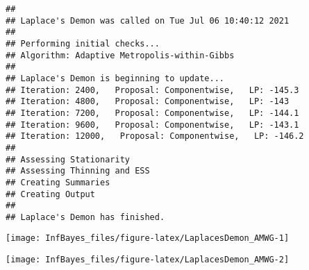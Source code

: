 \documentclass[
]{book}
\newenvironment{Shaded}{\begin{snugshade}}{\end{snugshade}}
\newcommand{\AttributeTok}[1]{\textcolor[rgb]{0.77,0.63,0.00}{#1}}
\newcommand{\CommentTok}[1]{\textcolor[rgb]{0.56,0.35,0.01}{\textit{#1}}}
\newcommand{\ConstantTok}[1]{\textcolor[rgb]{0.00,0.00,0.00}{#1}}
\newcommand{\DecValTok}[1]{\textcolor[rgb]{0.00,0.00,0.81}{#1}}
\newcommand{\FunctionTok}[1]{\textcolor[rgb]{0.00,0.00,0.00}{#1}}
\newcommand{\NormalTok}[1]{#1}
\newcommand{\OtherTok}[1]{\textcolor[rgb]{0.56,0.35,0.01}{#1}}
\newcommand{\SpecialCharTok}[1]{\textcolor[rgb]{0.00,0.00,0.00}{#1}}
\newcommand{\StringTok}[1]{\textcolor[rgb]{0.31,0.60,0.02}{#1}}
\begin{document}
\begin{verbatim}
## 
## Laplace's Demon was called on Tue Jul 06 10:40:12 2021
## 
## Performing initial checks...
## Algorithm: Adaptive Metropolis-within-Gibbs 
## 
## Laplace's Demon is beginning to update...
## Iteration: 2400,   Proposal: Componentwise,   LP: -145.3
## Iteration: 4800,   Proposal: Componentwise,   LP: -143
## Iteration: 7200,   Proposal: Componentwise,   LP: -144.1
## Iteration: 9600,   Proposal: Componentwise,   LP: -143.1
## Iteration: 12000,   Proposal: Componentwise,   LP: -146.2
## 
## Assessing Stationarity
## Assessing Thinning and ESS
## Creating Summaries
## Creating Output
## 
## Laplace's Demon has finished.
\end{verbatim}

\begin{Shaded}
\end{Shaded}

\begin{center}\texttt{[image: InfBayes\_files/figure-latex/LaplacesDemon\_AMWG-1]} \end{center}

\begin{center}\texttt{[image: InfBayes\_files/figure-latex/LaplacesDemon\_AMWG-2]} \end{center}
\end{document}
